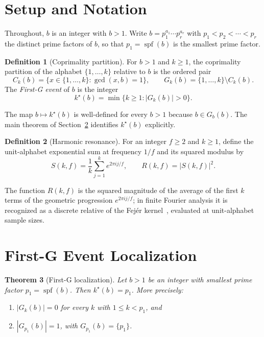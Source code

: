 \documentclass[11pt,reqno]{amsart}
\theoremstyle{plain}
\newtheorem{theorem}{Theorem}
\theoremstyle{definition}
\newtheorem{definition}[theorem]{Definition}
\theoremstyle{remark}
\DeclareMathOperator{\spf}{spf}
\begin{document}
\section{Setup and Notation}\label{sec:setup}

Throughout, $b$ is an integer with $b > 1$. Write $b = p_{1}^{a_{1}}
\cdots p_{r}^{a_{r}}$ with $p_{1} < p_{2} < \cdots < p_{r}$ the
distinct prime factors of $b$, so that $p_{1} = \spf(b)$ is the
smallest prime factor.

\begin{definition}[Coprimality partition]\label{def:partition}
For $b > 1$ and $k \ge 1$, the coprimality partition of the alphabet
$\{1,\dots,k\}$ relative to $b$ is the ordered pair
\[
  C_{k}(b) = \{x \in \{1,\dots,k\} : \gcd(x,b) = 1\},
  \qquad
  G_{k}(b) = \{1,\dots,k\}\setminus C_{k}(b).
\]
The \emph{First-G event} of $b$ is the integer
\[
  k^{\star}(b) = \min\{k \ge 1 : |G_{k}(b)| > 0\}.
\]
\end{definition}

The map $b \mapsto k^{\star}(b)$ is well-defined for every $b > 1$
because $b \in G_{b}(b)$. The main theorem of
Section~\ref{sec:firstg} identifies $k^{\star}(b)$ explicitly.

\begin{definition}[Harmonic resonance]\label{def:resonance}
For an integer $f \ge 2$ and $k \ge 1$, define the unit-alphabet
exponential sum at frequency $1/f$ and its squared modulus by
\[
  S(k,f) = \frac{1}{k}\sum_{j=1}^{k} e^{2\pi i j/f},
  \qquad
  R(k,f) = |S(k,f)|^{2}.
\]
\end{definition}

The function $R(k,f)$ is the squared magnitude of the average of
the first $k$ terms of the geometric progression $e^{2\pi i j/f}$;
in finite Fourier analysis it is recognized as a discrete relative
of the Fej\'{e}r kernel~\cite{Fejer1900,Zygmund2002}, evaluated at
unit-alphabet sample sizes.

\section{First-G Event Localization}\label{sec:firstg}

\begin{theorem}[First-G localization]\label{thm:firstg}
Let $b > 1$ be an integer with smallest prime factor $p_{1}=\spf(b)$.
Then $k^{\star}(b) = p_{1}$. More precisely:
\begin{enumerate}[label={\upshape(\roman*)}]
\item $|G_{k}(b)| = 0$ for every $k$ with $1 \le k < p_{1}$, and
\item $|G_{p_{1}}(b)| = 1$, with $G_{p_{1}}(b) = \{p_{1}\}$.
\end{enumerate}
\end{theorem}
\end{document}
